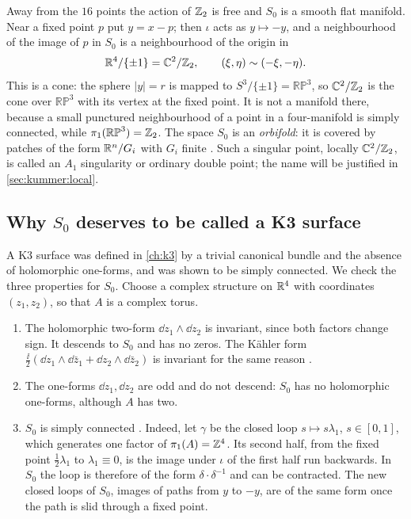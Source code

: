 Away from the $16$ points the action of $\mathbb{Z}_2$ is free and $S_0$ is a smooth flat manifold.
Near a fixed point $p$ put $y=x-p$; then $\iota$ acts as $y\mapsto-y$, and a neighbourhood of
the image of $p$ in $S_0$ is a neighbourhood of the origin in
\begin{equation}\label{eq:kummer:local}
  \mathbb{R}^4/\{\pm1\}=\mathbb{C}^2/\mathbb{Z}_2,\qquad (\xi,\eta)\sim(-\xi,-\eta).
\end{equation}
This is a cone: the sphere $|y|=r$ is mapped to $S^3/\{\pm1\}=\mathbb{RP}^3$, so
$\mathbb{C}^2/\mathbb{Z}_2$ is the cone over $\mathbb{RP}^3$ with its vertex at the fixed point. It is not a
manifold there, because a small punctured neighbourhood of a point in a four-manifold is
simply connected, while $\pi_1(\mathbb{RP}^3)=\mathbb{Z}_2$. The space $S_0$ is an
\emph{orbifold}: it is covered by patches of the form $\mathbb{R}^n/G_i$ with $G_i$
finite . Such a singular point, locally $\mathbb{C}^2/\mathbb{Z}_2$, is
called an $A_1$ singularity or ordinary double point;
the name will be justified in \cref{sec:kummer:local}.

\subsection{Why \texorpdfstring{$S_0$}{S0} deserves to be called a K3 surface}

A K3 surface was defined in \cref{ch:k3} by a trivial canonical bundle and the absence of
holomorphic one-forms, and was shown to be simply connected. We check the three properties
for $S_0$. Choose a complex structure on $\mathbb{R}^4$ with coordinates $(z_1,z_2)$, so that $A$ is
a complex torus.
\begin{enumerate}[leftmargin=*,itemsep=2pt]
\item The holomorphic two-form $\dd z_1\wedge\dd z_2$ is invariant, since both factors change
sign. It descends to $S_0$ and has no zeros. The Kähler form
$\frac{\ii}2(\dd z_1\wedge\dd\bar z_1+\dd z_2\wedge\dd\bar z_2)$ is invariant for the same
reason .
\item The one-forms $\dd z_1,\dd z_2$ are odd and do not descend: $S_0$ has no holomorphic
one-forms, although $A$ has two.
\item $S_0$ is simply connected . Indeed, let $\gamma$ be the
closed loop $s\mapsto s\lambda_1$, $s\in[0,1]$, which generates one factor of
$\pi_1(A)=\mathbb{Z}^4$. Its second half, from the fixed point $\frac12\lambda_1$ to
$\lambda_1\equiv0$, is the image under $\iota$ of the first half run backwards. In $S_0$ the
loop is therefore of the form $\delta\cdot\delta^{-1}$ and can be contracted. The new closed
loops of $S_0$, images of paths from $y$ to $-y$, are of the same form once the path is slid
through a fixed point.
\end{enumerate}

